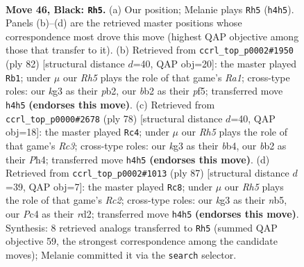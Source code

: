 \documentclass[11pt]{article}
\begin{document}
\clearpage

\begin{figure}[p]\centering
\begin{subfigure}{0.46\textwidth}\centering
\resizebox{\linewidth}{!}{%
\newchessgame
\chessboard[
  setfen={8/1p2pk2/n5pp/pN6/2p4r/2P2PK1/PB1R4/8 b - - 1 46},
  showmover=false,
  pgfstyle=straightmove, color=movearrow, markmove={h4-h5}
]}
\caption{}
\end{subfigure}\hfill
\begin{subfigure}{0.46\textwidth}\centering
\resizebox{\linewidth}{!}{%
\newchessgame
\chessboard[
  setfen={6k1/6p1/P7/2r2p1p/7P/6P1/1p2PPK1/R7 w - - 0 42},
  showmover=false,
  pgfstyle=straightmove, color=movearrow, markmove={a1-b1}
]}
\caption{}
\end{subfigure}
\\[4pt]
\begin{subfigure}{0.46\textwidth}\centering
\resizebox{\linewidth}{!}{%
\newchessgame
\chessboard[
  setfen={6k1/5pp1/8/2n4p/pb5P/2R3P1/P4PK1/8 w - - 4 40},
  showmover=false,
  pgfstyle=straightmove, color=movearrow, markmove={c3-c4}
]}
\caption{}
\end{subfigure}\hfill
\begin{subfigure}{0.46\textwidth}\centering
\resizebox{\linewidth}{!}{%
\newchessgame
\chessboard[
  setfen={5k2/2r2pp1/4p3/pN6/Pn3P2/4K1P1/1P1R4/8 b - - 10 44},
  showmover=false,
  pgfstyle=straightmove, color=movearrow, markmove={c7-c8}
]}
\caption{}
\end{subfigure}
\caption{\textbf{Move 46, Black: \texttt{Rh5}.} (a) Our position; Melanie plays \texttt{Rh5} (\texttt{h4h5}). Panels (b)--(d) are the retrieved master positions whose correspondence most drove this move (highest QAP objective among those that transfer to it). (b) Retrieved from \texttt{ccrl\_top\_p0002\#1950} (ply 82) [structural distance $d$=40, QAP obj=20]: the master played \texttt{Rb1}; under $\mu$ our \emph{Rh5} plays the role of that game's \emph{Ra1}; cross-type roles: our \emph{k}g3 as their \emph{p}b2, our \emph{b}b2 as their \emph{p}f5; transferred move \texttt{h4h5} \textbf{(endorses this move)}. (c) Retrieved from \texttt{ccrl\_top\_p0000\#2678} (ply 78) [structural distance $d$=40, QAP obj=18]: the master played \texttt{Rc4}; under $\mu$ our \emph{Rh5} plays the role of that game's \emph{Rc3}; cross-type roles: our \emph{k}g3 as their \emph{b}b4, our \emph{b}b2 as their \emph{P}h4; transferred move \texttt{h4h5} \textbf{(endorses this move)}. (d) Retrieved from \texttt{ccrl\_top\_p0002\#1013} (ply 87) [structural distance $d$=39, QAP obj=7]: the master played \texttt{Rc8}; under $\mu$ our \emph{Rh5} plays the role of that game's \emph{Rc2}; cross-type roles: our \emph{k}g3 as their \emph{n}b5, our \emph{P}c4 as their \emph{r}d2; transferred move \texttt{h4h5} \textbf{(endorses this move)}. Synthesis: 8 retrieved analogs transferred to \texttt{Rh5} (summed QAP objective 59, the strongest correspondence among the candidate moves); Melanie committed it via the \texttt{search} selector.}
\label{fig:thought-m91}
\end{figure}
\end{document}
